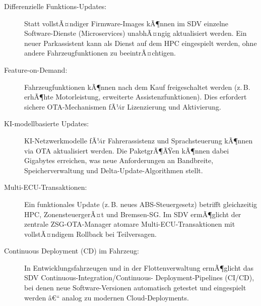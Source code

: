 ﻿\documentclass[12pt,a4paper,twoside]{article}
\begin{document}
\begin{description}
  \item[Differenzielle Funktions-Updates:] Statt vollstÃ¤ndiger Firmware-Images
    kÃ¶nnen im SDV einzelne Software-Dienste (Microservices) unabhÃ¤ngig aktualisiert
    werden. Ein neuer Parkassistent kann als Dienst auf dem HPC eingespielt werden,
    ohne andere Fahrzeugfunktionen zu beeintrÃ¤chtigen.
  \item[Feature-on-Demand:] Fahrzeugfunktionen kÃ¶nnen nach dem Kauf freigeschaltet
    werden (z.\,B. erhÃ¶hte Motorleistung, erweiterte Assistenzfunktionen). Dies
    erfordert sichere OTA-Mechanismen fÃ¼r Lizenzierung und Aktivierung.
  \item[KI-modellbasierte Updates:] KI-Netzwerkmodelle fÃ¼r Fahrerassistenz
    und Sprachsteuerung kÃ¶nnen via OTA aktualisiert werden. Die PaketgrÃ¶ÃŸen kÃ¶nnen
    dabei Gigabytes erreichen, was neue Anforderungen an Bandbreite,
    Speicherverwaltung und Delta-Update-Algorithmen stellt.
  \item[Multi-ECU-Transaktionen:] Ein funktionales Update (z.\,B. neues ABS-Steuer\-gesetz)
    betrifft gleichzeitig HPC, ZonensteuergerÃ¤t und Bremsen-SG. Im SDV ermÃ¶glicht
    der zentrale ZSG-OTA-Manager atomare Multi-ECU-Transaktionen mit vollstÃ¤ndigem
    Rollback bei Teilversagen.
  \item[Continuous Deployment (CD) im Fahrzeug:] In Entwicklungsfahrzeugen und
    in der Flottenverwaltung ermÃ¶glicht das SDV Continuous-Integration/Continuous-
    Deploy\-ment-Pipelines (CI/CD), bei denen neue Software-Versionen automatisch
    getestet und eingespielt werden â€“ analog zu modernen Cloud-Deployments.
\end{description}
\end{document}

